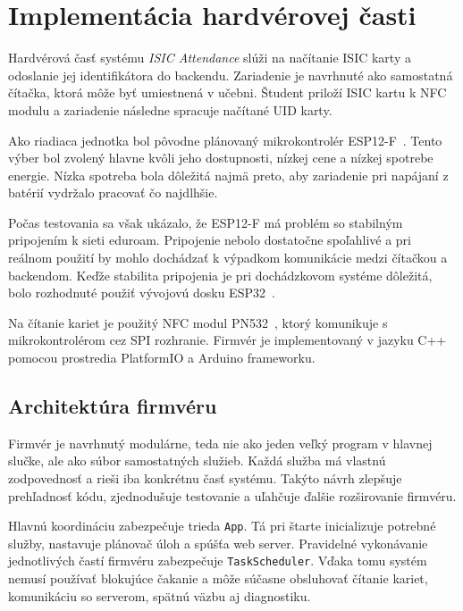 \chapter{Implementácia hardvérovej časti}
\label{sec:hardware-implementation}

Hardvérová časť systému \textit{ISIC Attendance} slúži na načítanie ISIC karty a odoslanie jej identifikátora do backendu. Zariadenie je navrhnuté ako samostatná čítačka, ktorá môže byť umiestnená v učebni. Študent priloží ISIC kartu k NFC modulu a zariadenie následne spracuje načítané UID karty.

Ako riadiaca jednotka bol pôvodne plánovaný mikrokontrolér ESP12-F~\cite{aithinker:esp12f,espressif:esp8266-trm}. Tento výber bol zvolený hlavne kvôli jeho dostupnosti, nízkej cene a nízkej spotrebe energie. Nízka spotreba bola dôležitá najmä preto, aby zariadenie pri napájaní z batérií vydržalo pracovať čo najdlhšie.

Počas testovania sa však ukázalo, že ESP12-F má problém so stabilným pripojením k sieti eduroam. Pripojenie nebolo dostatočne spoľahlivé a pri reálnom použití by mohlo dochádzať k výpadkom komunikácie medzi čítačkou a backendom. Keďže stabilita pripojenia je pri dochádzkovom systéme dôležitá, bolo rozhodnuté použiť vývojovú dosku ESP32~\cite{espressif:esp32-trm}.

Na čítanie kariet je použitý NFC modul PN532~\cite{nxp:pn532-um}, ktorý komunikuje s mikrokontrolérom cez SPI rozhranie. Firmvér je implementovaný v jazyku C++ pomocou prostredia PlatformIO a Arduino frameworku.
\section{Architektúra firmvéru}
\label{subsec:firmware-architecture}

Firmvér je navrhnutý modulárne, teda nie ako jeden veľký program v hlavnej slučke, ale ako súbor samostatných služieb. Každá služba má vlastnú zodpovednosť a rieši iba konkrétnu časť systému. Takýto návrh zlepšuje prehľadnosť kódu, zjednodušuje testovanie a uľahčuje ďalšie rozširovanie firmvéru.

Hlavnú koordináciu zabezpečuje trieda \texttt{App}. Tá pri štarte inicializuje potrebné služby, nastavuje plánovač úloh a spúšťa web server. Pravidelné vykonávanie jednotlivých častí firmvéru zabezpečuje \texttt{TaskScheduler}. Vďaka tomu systém nemusí používať blokujúce čakanie a môže súčasne obsluhovať čítanie kariet, komunikáciu so serverom, spätnú väzbu aj diagnostiku.

